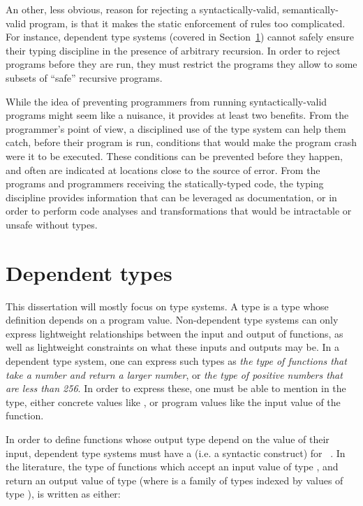 An other, less obvious, reason for rejecting a syntactically-valid,
semantically-valid program, is that it makes the static enforcement of rules too
complicated.  For instance, dependent type systems (covered
in Section~\ref{dependent-types}) cannot safely ensure their typing discipline in the
presence of arbitrary recursion.  In order to reject programs before they are
run, they must restrict the programs they allow to some subsets of ``safe''
recursive programs.

While the idea of preventing programmers from running syntactically-valid
programs might seem like a nuisance, it provides at least two benefits.  From
the programmer's point of view, a disciplined use of the type system can help
them catch, before their program is run, conditions that would make the program
crash were it to be executed.  These conditions can be prevented before they
happen, and often are indicated at locations close to the source of error.  From
the programs and programmers receiving the statically-typed code, the typing
discipline provides information that can be leveraged as documentation, or in
order to perform code analyses and transformations that would be intractable or
unsafe without types.

\section{Dependent types}
\label{dependent-types}

This dissertation will mostly focus on  type systems.  A
 type is a type whose definition depends on a program value.
Non-dependent type systems can only express lightweight relationships between
the input and output of functions, as well as lightweight constraints on what
these inputs and outputs may be.  In a dependent type system, one can express
such types as \textit{the type of functions that take a number and return a
larger number}, or \textit{the type of positive numbers that are less than 256}.
In order to express these, one must be able to mention in the type, either
concrete values like , or program values like the input value of
the function.

In order to define functions whose output type depend on the value of their
input, dependent type systems must have a  (i.e. a syntactic
construct) for ~\footnotemark.  In the literature,
the type of functions which accept an input value  of type
, and return an output value of type  (where
 is a family of types indexed by values of type ), is
written as either:

